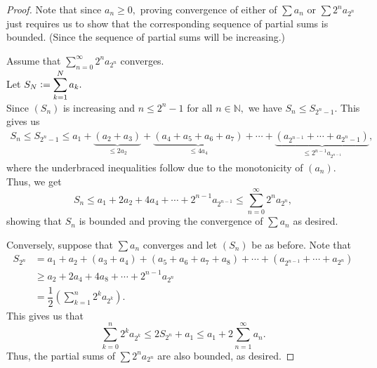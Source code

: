 \cauchycondens*\label{thm:cauchycondens2}
\begin{flushright}\hyperref[thm:cauchycondens]{\upsym}\end{flushright}
\begin{proof}
	Note that since $a_n \ge 0,$ proving convergence of either of $\sum a_n$ or $\sum 2^na_{2^n}$ just requires us to show that the corresponding sequence of partial sums is bounded. (Since the sequence of partial sums will be increasing.)
	
	\hrulefill
	
	Assume that $\displaystyle\sum_{n=0}^{\infty}2^na_{2^n}$ converges.\\
	Let $S_N \vcentcolon= \displaystyle\sum_{k=1}^{N}a_k.$\\
	Since $(S_n)$ is increasing and $n \le 2^{n}-1$ for all $n \in \mathbb{N},$ we have $S_n \le S_{2^n-1}.$ This gives us
	\begin{align*} 
		S_n \le S_{2^n-1} \le a_1 + \underbrace{(a_2 + a_3)}_{\le 2a_2} + \underbrace{(a_4 + a_5 + a_6 + a_7)}_{\le 4a_4} + \cdots + \underbrace{(a_{2^{n-1}} + \cdots + a_{2^n-1})}_{\le 2^{n-1}a_{2^{n-1}}},
	\end{align*}
	where the underbraced inequalities follow due to the monotonicity of $(a_n).$
	Thus, we get 
	\begin{equation*} 
		S_n \le a_1 + 2a_2 + 4a_4 + \cdots + 2^{n-1}a_{2^{n-1}} \le \sum_{n=0}^{\infty}2^na_{2^n},
	\end{equation*}
	showing that $S_n$ is bounded and proving the convergence of $\sum a_n$ as desired.
	
	\hrulefill
	
	Conversely, suppose that $\sum a_n$ converges and let $(S_n)$ be as before. Note that
	\begin{align*} 
		S_{2^n} &= a_1 + a_2 + (a_3 + a_4) + (a_5 + a_6 + a_7 + a_8) +\cdots + (a_{2^{n-1}} + \cdots + a_{2^n})\\
		&\ge a_2 + 2a_4 + 4a_8 + \cdots + 2^{n-1}a_{2^n}\\
		&= \dfrac{1}{2}\left(\sum_{k=1}^{n}2^ka_{2^k}\right).
	\end{align*}
	This gives us that
	\begin{equation*} 
		\sum_{k=0}^{n}2^ka_{2^k} \le 2S_{2^n} + a_1 \le a_1 + 2\sum_{n=1}^{\infty}a_n.
	\end{equation*}
	Thus, the partial sums of $\sum 2^na_{2^n}$ are also bounded, as desired.
\end{proof}

